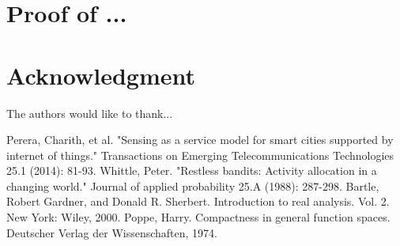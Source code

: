 \documentclass[conference]{IEEEtran}
\begin{document}
\appendices
\section{Proof of ...}

\section*{Acknowledgment}


The authors would like to thank...


\ifCLASSOPTIONcaptionsoff
  \newpage
\fi





%
%
%
\begin{thebibliography}{1}

Perera, Charith, et al. "Sensing as a service model for smart cities supported by internet of things." Transactions on Emerging Telecommunications Technologies 25.1 (2014): 81-93.
Whittle, Peter. "Restless bandits: Activity allocation in a changing world." Journal of applied probability 25.A (1988): 287-298.
Bartle, Robert Gardner, and Donald R. Sherbert. Introduction to real analysis. Vol. 2. New York: Wiley, 2000.
Poppe, Harry. Compactness in general function spaces. Deutscher Verlag der Wissenschaften, 1974.
\end{thebibliography}
\end{document}
